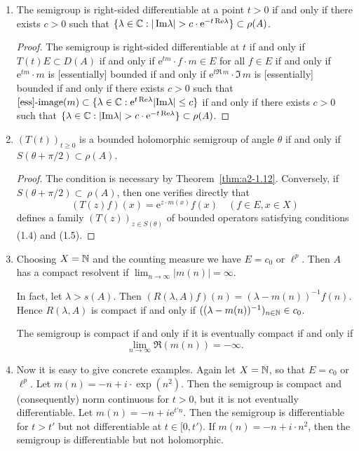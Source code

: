 \begin{example}
\begin{enumerate}[\upshape (i), wide, labelsep=.5em]
\item \label{ex:a2-1.28-2}
The semigroup is right-sided differentiable at a point
$t > 0$ 
if and only if there exists $c > 0$ such that 
$\{\lambda \in \mathbb{C} : |\mathop{}\!\mathrm{Im} \lambda| > c \cdot \mathrm{e}^{-t\mathop{}\!\mathrm{Re}\lambda}\} \subset \rho(A)$.

\begin{proof}
The semigroup is right-sided differentiable at $t$ 
if and only if $T(t)E \subset D(A)$ 
if and only if $\mathrm{e}^{tm} \cdot f \cdot m \in E$ for all $f \in E$ 
if and only if $\mathrm{e}^{tm} \cdot m$ is [essentially] bounded 
if and only if $\mathrm{e}^{t\Re\, m} \cdot \Im\, m$ is [essentially] bounded 
if and only if there exists $c > 0$ such that 
$[\text{ess}]\text{-}\text{image}(m) \subset 
\{\lambda \in \mathbb{C} : \mathrm{e}^{t\mathop{}\!\mathrm{Re}\lambda}|\text{Im}\lambda| \leq c\}$ 
if and only if there exists $c > 0$ such that 
$\{\lambda \in \mathbb{C} : |\text{Im}\lambda| > c \cdot \mathrm{e}^{-t\mathop{}\!\mathrm{Re}\lambda}\} \subset \rho(A)$.
\end{proof}

\item \label{ex:a2-1.28-3}
$(T(t))_{t \geq 0}$ is a bounded holomorphic semigroup of angle $\theta$ if and only if \\
$S(\theta + \pi/2) \subset \rho(A)$.

\begin{proof}
The condition is necessary by Theorem~\ref{thm:a2-1.12}.
Conversely, if $S(\theta + \pi/2) \subset~\rho(A)$, 
then one verifies directly that 
\[
(T(z)f)(x) = \mathrm{e}^{z \cdot m(x)}f(x) \quad (f \in E, x \in X) 
\]
defines a family $(T(z))_{z \in S(\theta)}$ of bounded operators satisfying conditions (1.4) and (1.5).
\end{proof}

\item \label{ex:a2-1.28-4}
Choosing $X = \mathbb{N}$ and the counting measure we have $E = c_{0}$ or $\ell^{p}$.
Then $A$ has a compact resolvent if 
$\lim_{n \to \infty} |m(n)| = \infty$.  

In fact, let $\lambda > s(A)$.
Then $(R(\lambda,A)f)(n) = (\lambda-m(n))^{-1}f(n)$.
Hence $R(\lambda,A)$ is compact if and only if $((\lambda-m(n))^{-1})_{n \in \mathbb{N}} \in c_{0}$. 

The semigroup is compact if and only if it is eventually compact if and only if 
\[
\lim_{n \to \infty} \Re(m(n)) = -\infty.
\]

\item \label{ex:a2-1.28-5}
Now it is easy to give concrete examples.
Again let $X = \mathbb{N}$, so that $E = c_{0}$ or $\ell^{p}$.
Let $m(n) = -n + i \cdot \exp(n^2)$.
Then the semigroup is compact and (consequently) norm continuous for $t > 0$, but it is not eventually differentiable.
Let $m(n) = -n + i\mathrm{e}^{t'n}$.
Then the semigroup is differentiable for $t > t'$ but not differentiable at $t \in [0,t')$.
If $m(n) = -n + i \cdot n^2$, then the semigroup is differentiable but not holomorphic.
\end{enumerate}
\end{example}	

